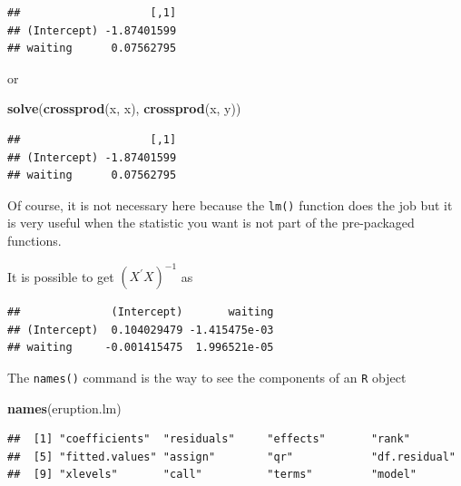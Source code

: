 \documentclass[]{article}
\newenvironment{Shaded}{\begin{snugshade}}{\end{snugshade}}
\newcommand{\KeywordTok}[1]{\textcolor[rgb]{0.13,0.29,0.53}{\textbf{{#1}}}}
\newcommand{\NormalTok}[1]{{#1}}
\numberwithin{equation}{section}
\begin{document}
\begin{verbatim}
##                    [,1]
## (Intercept) -1.87401599
## waiting      0.07562795
\end{verbatim}

or

\begin{Shaded}
\begin{Highlighting}[]
\KeywordTok{solve}\NormalTok{(}\KeywordTok{crossprod}\NormalTok{(x, x), }\KeywordTok{crossprod}\NormalTok{(x, y))}
\end{Highlighting}
\end{Shaded}

\begin{verbatim}
##                    [,1]
## (Intercept) -1.87401599
## waiting      0.07562795
\end{verbatim}

Of course, it is not necessary here because the \texttt{lm()} function
does the job but it is very useful when the statistic you want is not
part of the pre-packaged functions.

It is possible to get \((X^\prime X)^{-1}\) as

\begin{Shaded}
\end{Shaded}

\begin{verbatim}
##              (Intercept)       waiting
## (Intercept)  0.104029479 -1.415475e-03
## waiting     -0.001415475  1.996521e-05
\end{verbatim}

The \texttt{names()} command is the way to see the components of an
\texttt{R} object

\begin{Shaded}
\begin{Highlighting}[]
\KeywordTok{names}\NormalTok{(eruption.lm)}
\end{Highlighting}
\end{Shaded}

\begin{verbatim}
##  [1] "coefficients"  "residuals"     "effects"       "rank"         
##  [5] "fitted.values" "assign"        "qr"            "df.residual"  
##  [9] "xlevels"       "call"          "terms"         "model"
\end{verbatim}
\end{document}
